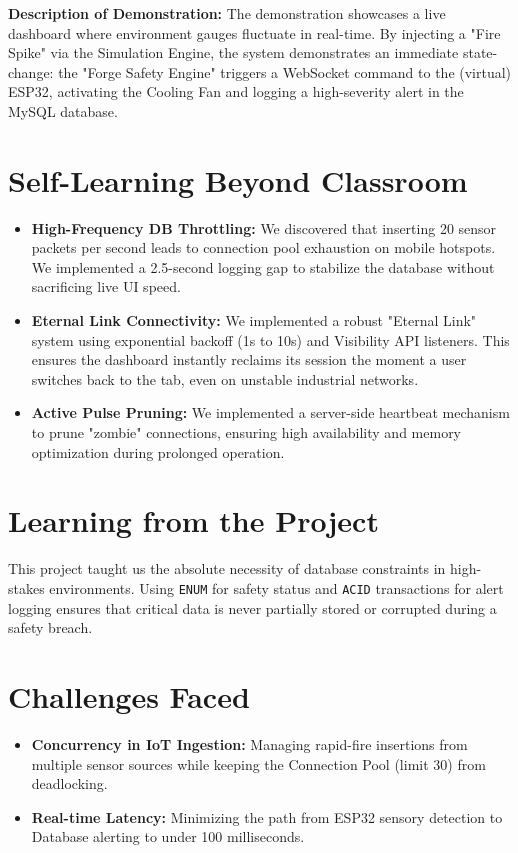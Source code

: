 \documentclass[12pt, a4paper]{article}
\begin{document}
\textbf{Description of Demonstration:} The demonstration showcases a live dashboard where environment gauges fluctuate in real-time. By injecting a "Fire Spike" via the Simulation Engine, the system demonstrates an immediate state-change: the "Forge Safety Engine" triggers a WebSocket command to the (virtual) ESP32, activating the Cooling Fan and logging a high-severity alert in the MySQL database.

\section{Self-Learning Beyond Classroom}
\begin{itemize}
    \item \textbf{High-Frequency DB Throttling:} We discovered that inserting 20 sensor packets per second leads to connection pool exhaustion on mobile hotspots. We implemented a 2.5-second logging gap to stabilize the database without sacrificing live UI speed.
    \item \textbf{Eternal Link Connectivity:} We implemented a robust "Eternal Link" system using exponential backoff (1s to 10s) and Visibility API listeners. This ensures the dashboard instantly reclaims its session the moment a user switches back to the tab, even on unstable industrial networks.
    \item \textbf{Active Pulse Pruning:} We implemented a server-side heartbeat mechanism to prune "zombie" connections, ensuring high availability and memory optimization during prolonged operation.
\end{itemize}

\section{Learning from the Project}
This project taught us the absolute necessity of database constraints in high-stakes environments. Using \texttt{ENUM} for safety status and \texttt{ACID} transactions for alert logging ensures that critical data is never partially stored or corrupted during a safety breach.

\section{Challenges Faced}
\begin{itemize}
    \item \textbf{Concurrency in IoT Ingestion:} Managing rapid-fire insertions from multiple sensor sources while keeping the Connection Pool (limit 30) from deadlocking.
    \item \textbf{Real-time Latency:} Minimizing the path from ESP32 sensory detection to Database alerting to under 100 milliseconds.
\end{itemize}
\end{document}
